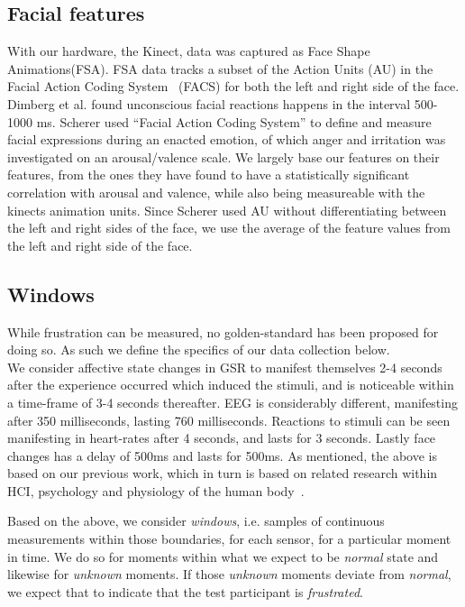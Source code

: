 \subsection{Facial features}
With our hardware, the Kinect, data was captured as Face Shape Animations(FSA)\cite{faceshapes}.
FSA data tracks a subset of the Action Units (AU) in the Facial Action Coding System~\cite{facs_kinect_muscles} (FACS) for both the left and right side of the face.
Dimberg et al. \cite{face_onset} found unconscious facial reactions happens in the interval 500-1000 ms.
Scherer used ``Facial Action Coding System'' to define and measure facial expressions during an enacted emotion, of which anger and irritation was investigated on an arousal/valence scale.\cite{scherer_kinect}
We largely base our features on their features, from the ones they have found to have a statistically significant correlation with arousal and valence, while also being measureable with the kinects animation units.
Since Scherer used AU without differentiating between the left and right sides of the face, we use the average of the feature values from the left and right side of the face.

\subsection{Windows}
While frustration can be measured, no golden-standard has been proposed for doing so. 
As such we define the specifics of our data collection below.\\
We consider affective state changes in GSR to manifest themselves 2-4 seconds after the experience occurred which
induced the stimuli, and is noticeable within a time-frame of 3-4 seconds thereafter. EEG is considerably different,
manifesting after 350 milliseconds, lasting 760 milliseconds. Reactions to stimuli can be seen manifesting in heart-rates
after 4 seconds, and lasts for 3 seconds. Lastly face changes has a delay of 500ms and lasts for 500ms. As mentioned,
the above is based on our previous work, which in turn is based on related research within HCI, psychology and
physiology of the human body~\cite{9th_semester_project}.

Based on the above, we consider \textit{windows}, i.e. samples of continuous measurements within those boundaries, for
each sensor, for a particular moment in time. We do so for moments within what we expect to be \textit{normal} state and
likewise for \textit{unknown} moments. If those \textit{unknown} moments deviate from \textit{normal}, we expect that to
indicate that the test participant is \textit{frustrated}.
